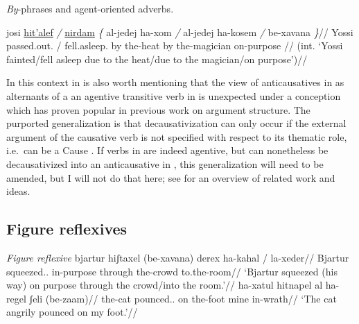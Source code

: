 \pex \emph{By}-phrases and agent-oriented adverbs.
		
		\a \ljudge{*} \begingl
			\gla josi \underline{hit'alef} \emph{/} \underline{nirdam} \emph{\{} al-jedej ha-xom \emph{/} al-jedej ha-kosem \emph{/} be-xavana \emph{\}}//
			\glb Yossi passed.out. / fell.asleep. {} by the-heat {} by the-magician {} on-purpose {}//
			\glft (int. `Yossi fainted/fell asleep due to the heat/due to the magician/on purpose')//
		\endgl
\xe





In this context in is also worth mentioning that the view of anticausatives in {\thit} as alternants of a an agentive transitive verb in {\tpie} is unexpected under a conception which has proven popular in previous work on argument structure. The purported generalization is that decausativization can only occur if the external argument of the causative verb is not specified with respect to its thematic role, i.e.~can be a Cause \citep{unaccusativity95,reinhart02}. If verbs in {\tpie} are indeed agentive, but can nonetheless be decausativized into an anticausative in {\thit}, this generalization will need to be amended, but I will not do that here; see \citet[52]{layering15} for an overview of related work and ideas.

	\subsection{Figure reflexives} \label{vz:thit:figrefl}

\pex\label{ex:vz:figrefl-va2}\textit{Figure reflexive}
	\a \begingl
		\gla bjartur hiʃtaxel (be-xavana) derex ha-kahal / la-xeder//
		\glb Bjartur squeezed.. in-purpose through the-crowd {} to.the-room//
		\glft `Bjartur squeezed (his way) on purpose through the crowd/into the room.'//
		\endgl
	\a \begingl
		\gla ha-xatul hitnapel al ha-regel ʃeli (be-zaam)//
		\glb the-cat pounced.. on the-foot mine in-wrath//
		\glft `The cat angrily pounced on my foot.'//
		\endgl
\xe


